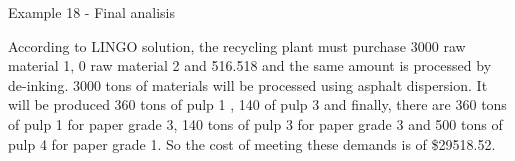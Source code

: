 \begin{frame}{Example 18 - Final analisis}

According to LINGO solution, the recycling plant must purchase 3000 raw material 1, 0 raw material 2
and 516.518 and the same amount is processed by de-inking. 3000 tons of materials will be processed
using asphalt dispersion. It will be produced 360 tons of pulp 1 , 140 of pulp 3 and finally, there are
360 tons of pulp 1 for paper grade 3, 140 tons of pulp 3 for paper grade 3 and 500 tons of pulp 4
for paper grade 1. So the cost of meeting these demands is of \$29518.52.

\end{frame}
